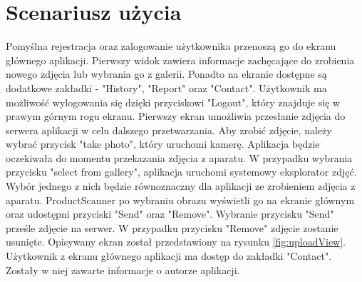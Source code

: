 \section{Scenariusz użycia}{

Pomyślna rejestracja oraz zalogowanie użytkownika przenoszą go do ekranu głównego aplikacji. Pierwszy widok zawiera informacje zachęcające do zrobienia nowego zdjęcia lub wybrania go z galerii. Ponadto na ekranie dostępne są dodatkowe zakładki - "History", "Report" oraz "Contact". Użytkownik ma możliwość wylogowania się dzięki przyciskowi "Logout", który znajduje się \mbox{w} prawym górnym rogu ekranu. Pierwszy ekran umożliwia przesłanie zdjęcia do serwera aplikacji w celu dalszego przetwarzania. Aby zrobić zdjęcie, należy wybrać przycisk "take photo", który uruchomi kamerę. Aplikacja będzie oczekiwała do momentu przekazania zdjęcia z aparatu. W przypadku wybrania przycisku "select from gallery", aplikacja uruchomi systemowy eksplorator zdjęć. Wybór jednego z nich będzie równoznaczny dla aplikacji ze zrobieniem zdjęcia z aparatu. ProductScanner po wybraniu obrazu wyświetli go na ekranie głównym oraz udostępni przyciski "Send" oraz "Remove". Wybranie przycisku "Send" prześle zdjęcie na serwer. W przypadku przycisku "Remove" zdjęcie zostanie usunięte. Opisywany ekran został przedstawiony na rysunku \ref{fig:uploadView}. Użytkownik z ekranu głównego aplikacji ma dostęp do zakładki "Contact". Zostały w niej zawarte informacje o autorze aplikacji.

}
